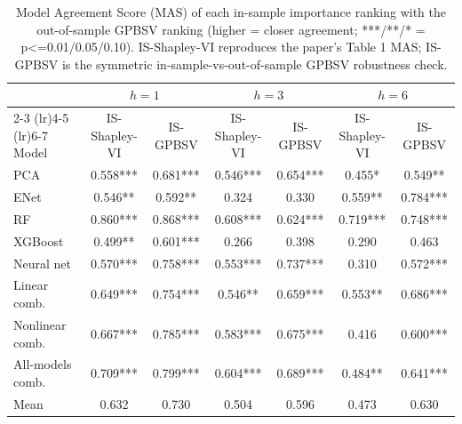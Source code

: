 \begin{table}[htbp]
\centering
\caption{Model Agreement Score (MAS) of each in-sample importance ranking with the out-of-sample GPBSV ranking (higher = closer agreement; ***/**/* = p<=0.01/0.05/0.10). IS-Shapley-VI reproduces the paper's Table 1 MAS; IS-GPBSV is the symmetric in-sample-vs-out-of-sample GPBSV robustness check.}
\label{tab:mas_isgpbsv}
\begin{tabular}{lcccccc}
\toprule
 & \multicolumn{2}{c}{$h=1$} & \multicolumn{2}{c}{$h=3$} & \multicolumn{2}{c}{$h=6$} \\
\cmidrule(lr){2-3} \cmidrule(lr){4-5} \cmidrule(lr){6-7}
Model & IS-Shapley-VI & IS-GPBSV & IS-Shapley-VI & IS-GPBSV & IS-Shapley-VI & IS-GPBSV \\
\midrule
PCA & 0.558*** & 0.681*** & 0.546*** & 0.654*** & 0.455* & 0.549** \\
ENet & 0.546** & 0.592** & 0.324 & 0.330 & 0.559** & 0.784*** \\
RF & 0.860*** & 0.868*** & 0.608*** & 0.624*** & 0.719*** & 0.748*** \\
XGBoost & 0.499** & 0.601*** & 0.266 & 0.398 & 0.290 & 0.463 \\
Neural net & 0.570*** & 0.758*** & 0.553*** & 0.737*** & 0.310 & 0.572*** \\
Linear comb. & 0.649*** & 0.754*** & 0.546** & 0.659*** & 0.553** & 0.686*** \\
Nonlinear comb. & 0.667*** & 0.785*** & 0.583*** & 0.675*** & 0.416 & 0.600*** \\
All-models comb. & 0.709*** & 0.799*** & 0.604*** & 0.689*** & 0.484** & 0.641*** \\
\midrule
Mean & 0.632 & 0.730 & 0.504 & 0.596 & 0.473 & 0.630 \\
\bottomrule
\end{tabular}
\end{table}